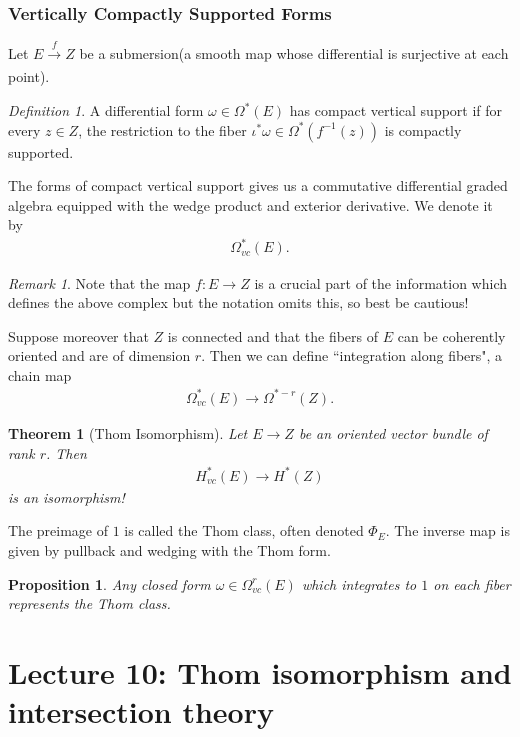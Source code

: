 \documentclass[12pt]{amsart}
\newtheorem{proposition}{Proposition}
\newtheorem{theorem}{Theorem}
\theoremstyle{remark}
\newtheorem{definition}{Definition}
\newtheorem{remark}{Remark}
\begin{document}
\subsubsection{Vertically Compactly Supported Forms}

Let $ E \xrightarrow[]{f}Z$ be a submersion(a smooth map whose differential is surjective at each point). 
\begin{definition}
A differential form $ \omega \in \Omega^\ast ( E)$ has compact vertical support if for every $ z \in Z$, the restriction to the fiber  $\iota^\ast \omega \in \Omega^\ast ({f^{-1} (z)})$ is compactly supported. 
\end{definition}
The forms of compact vertical support gives us a commutative differential graded algebra equipped with the wedge product and exterior derivative. We denote it by
\begin{align*}
    \Omega^\ast_{vc} ( E ).
\end{align*}
\begin{remark}
Note that the map $ f: E \rightarrow Z$ is a crucial part of the information which defines the above complex but the notation omits this, so best be cautious!
\end{remark}

Suppose moreover that $Z$ is connected and that the fibers of $E$ can be coherently oriented and are of dimension $r$. Then we can define ``integration along fibers", a chain map
\begin{align*}
    \Omega^\ast_{vc} (E) \rightarrow \Omega^{\ast-r} ( Z).
\end{align*}
\begin{theorem}[Thom Isomorphism]
Let $E \rightarrow Z$ be an oriented vector bundle of rank $r$. Then
\begin{align*}
    H^\ast_{vc} (E) \rightarrow H^\ast ( Z)
\end{align*}
is an isomorphism!
\end{theorem}
The preimage of $1$ is called the Thom class, often denoted $ \Phi_E$. The inverse map is given by pullback and wedging with the Thom form. 
\begin{proposition}
 Any closed form $ \omega \in \Omega^r_{vc} (E)$   which integrates to $1$ on each fiber represents the Thom class. 
\end{proposition}

 \section{Lecture 10: Thom isomorphism and intersection theory}
 
\end{document}
